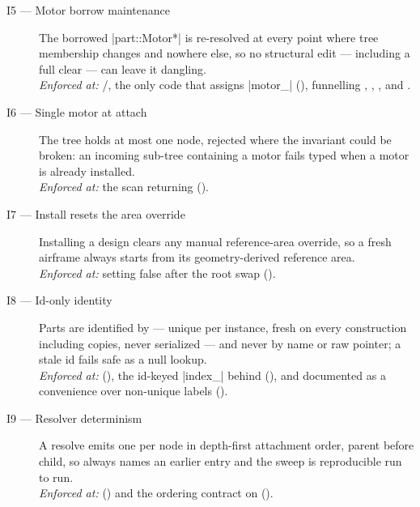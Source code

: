 \begin{description}
\item[I5 --- Motor borrow maintenance] The borrowed \cppinline|part::Motor*| is
  re-resolved at every point where tree membership changes and nowhere else, so no
  structural edit --- including a full clear --- can leave it dangling.\\
  \emph{Enforced at:} /, the only code
  that assigns \cppinline|motor_| (), funnelling
  , , , and .

\item[I6 --- Single motor at attach] The tree holds at most one  node,
  rejected where the invariant could be broken: an incoming sub-tree containing a motor
  fails typed when a motor is already installed.\\
  \emph{Enforced at:} the  scan returning
   ().

\item[I7 --- Install resets the area override] Installing a design clears any manual
  reference-area override, so a fresh airframe always starts from its geometry-derived
  reference area.\\
  \emph{Enforced at:}  setting
   false after the root swap
  ().

\item[I8 --- Id-only identity] Parts are identified by  --- unique per
  instance, fresh on every construction including copies, never serialized --- and
  never by name or raw pointer; a stale id fails safe as a null lookup.\\
  \emph{Enforced at:}  (), the
  id-keyed \cppinline|index_| behind 
  (), and  documented as a
  convenience over non-unique labels ().

\item[I9 --- Resolver determinism] A resolve emits one  per node in
  depth-first attachment order, parent before child, so  always names an
  earlier entry and the sweep is reproducible run to run.\\
  \emph{Enforced at:}  () and the
  ordering contract on  ().


\end{description}
